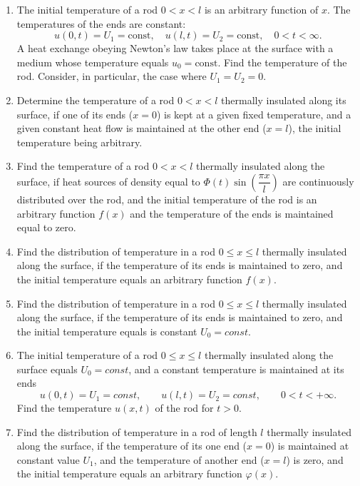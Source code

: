 \begin{enumerate}
\item The initial temperature of a rod $0<x<l$ is an arbitrary function of $x$. The temperatures of the ends are constant:
\begin{equation*}
u(0,t) = U_{1} = \mathrm{const}, \quad u(l,t) = U_{2} = \mathrm{const}, \quad 0<t<\infty.
\end{equation*}
A heat exchange obeying Newton's law takes place at the surface with a medium whose temperature equals $u_{0}=\mathrm{const}$. Find the temperature of the rod. Consider, in particular, the case where $U_{1}=U_{2}=0$.
\item Determine the temperature of a rod $0<x<l$ thermally insulated along its surface, if one of its ends ($x=0$) is kept at a given fixed temperature, and a given constant heat flow is maintained at the other end ($x=l$), the initial temperature being arbitrary.
\item Find the temperature of a rod $0<x<l$ thermally insulated along the surface, if heat sources of density equal to $\Phi(t)\sin\left(\dfrac{\pi x}{l}\right)$ are continuously distributed over the rod, and the initial temperature of the rod is an arbitrary function $f(x)$ and the temperature of the ends is maintained equal to zero.
\item Find the distribution of temperature in a rod $0\leq x\leq l$ thermally insulated along the surface, if the temperature of its ends is maintained to zero, and the initial temperature equals an arbitrary function $f(x)$.
\item Find the distribution of temperature in a rod $0\leq x\leq l$ thermally insulated along the surface, if the temperature of its ends is maintained to zero, and the initial temperature equals is constant $U_{0}=const$.
\item The initial temperature of a rod $0\leq x\leq l$ thermally insulated along the surface equals $U_{0}=const$, and a constant temperature is maintained at its ends 
\begin{equation*}
u(0,t)=U_{1}=const, \qquad u(l,t)=U_{2}=const, \qquad 0<t<+\infty.
\end{equation*}
Find the temperature $u(x,t)$ of the rod for $t>0$.
\item Find the distribution of temperature in a rod of length $l$ thermally insulated along the surface, if the temperature of its one end ($x=0$) is maintained at constant value $U_{1}$, and the temperature of another end ($x=l$) is zero, and the initial temperature equals an arbitrary function $\varphi(x)$.

\end{enumerate}
